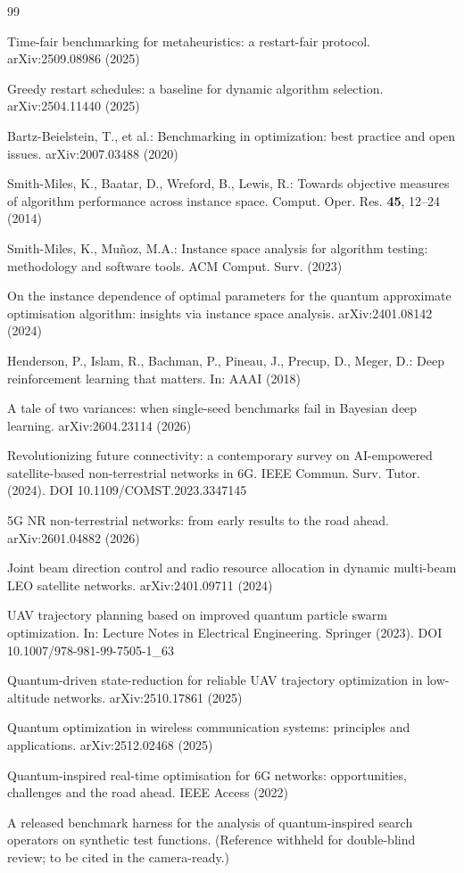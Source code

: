 \documentclass[runningheads]{llncs}
\begin{document}
\begin{thebibliography}{99}

Time-fair benchmarking for metaheuristics: a restart-fair protocol. arXiv:2509.08986 (2025)

Greedy restart schedules: a baseline for dynamic algorithm selection. arXiv:2504.11440 (2025)

Bartz-Beielstein, T., et al.: Benchmarking in optimization: best practice and open issues.
arXiv:2007.03488 (2020)

Smith-Miles, K., Baatar, D., Wreford, B., Lewis, R.: Towards objective measures of algorithm
performance across instance space. Comput. Oper. Res. \textbf{45}, 12--24 (2014)

Smith-Miles, K., Mu\~noz, M.A.: Instance space analysis for algorithm testing: methodology and
software tools. ACM Comput. Surv. (2023)

On the instance dependence of optimal parameters for the quantum approximate optimisation
algorithm: insights via instance space analysis. arXiv:2401.08142 (2024)

Henderson, P., Islam, R., Bachman, P., Pineau, J., Precup, D., Meger, D.: Deep reinforcement
learning that matters. In: AAAI (2018)

A tale of two variances: when single-seed benchmarks fail in Bayesian deep learning.
arXiv:2604.23114 (2026)

Revolutionizing future connectivity: a contemporary survey on AI-empowered satellite-based
non-terrestrial networks in 6G. IEEE Commun. Surv. Tutor. (2024).
DOI 10.1109/COMST.2023.3347145

5G NR non-terrestrial networks: from early results to the road ahead. arXiv:2601.04882 (2026)

Joint beam direction control and radio resource allocation in dynamic multi-beam LEO satellite
networks. arXiv:2401.09711 (2024)

UAV trajectory planning based on improved quantum particle swarm optimization. In: Lecture Notes
in Electrical Engineering. Springer (2023). DOI 10.1007/978-981-99-7505-1\_63

Quantum-driven state-reduction for reliable UAV trajectory optimization in low-altitude
networks. arXiv:2510.17861 (2025)

Quantum optimization in wireless communication systems: principles and applications.
arXiv:2512.02468 (2025)

Quantum-inspired real-time optimisation for 6G networks: opportunities, challenges and the road
ahead. IEEE Access (2022)

A released benchmark harness for the analysis of quantum-inspired search operators on synthetic
test functions. (Reference withheld for double-blind review; to be cited in the camera-ready.)

\end{thebibliography}
\end{document}
